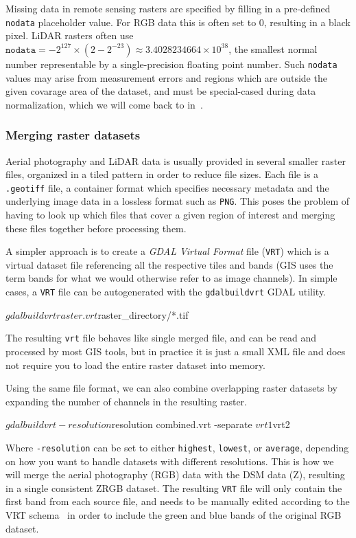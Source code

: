 Missing data in remote sensing rasters are specified by filling in a pre-defined \texttt{nodata} placeholder value.
For RGB data this is often set to $0$, resulting in a black pixel.
LiDAR rasters often use $\texttt{nodata} = -2^{127} \times (2 - 2^{-23}) \approx 3.4028234664 \times 10^{38}$, the smallest normal number representable by a single-precision floating point number.
Such \texttt{nodata} values may arise from measurement errors and regions which are outside the given covarage area of the dataset, and must be special-cased during data normalization, which we will come back to in~.

\subsubsection*{Merging raster datasets}

Aerial photography and LiDAR data is usually provided in several smaller raster files, organized in a tiled pattern in order to reduce file sizes.
Each file is a \texttt{.geotiff} file, a container format which specifies necessary metadata and the underlying image data in a lossless format such as \texttt{PNG}.
This poses the problem of having to look up which files that cover a given region of interest and merging these files together before processing them.

A simpler approach is to create a \textit{GDAL Virtual Format} file (\texttt{VRT}) which is a virtual dataset file referencing all the respective tiles and bands (GIS uses the term bands for what we would otherwise refer to as image channels).
In simple cases, a \texttt{VRT} file can be autogenerated with the \texttt{gdalbuildvrt} GDAL utility.

\begin{shellcode}
$ gdalbuildvrt raster.vrt ${raster_directory}/*.tif
\end{shellcode}
%
The resulting \texttt{vrt} file behaves like single merged file, and can be read and processed by most GIS tools, but in practice it is just a small XML file and does not require you to load the entire raster dataset into memory.

Using the same file format, we can also combine overlapping raster datasets by expanding the number of channels in the resulting raster.

\begin{shellcode}
$ gdalbuildvrt -resolution ${resolution} combined.vrt -separate ${vrt1} ${vrt2} 
\end{shellcode}
%
Where \texttt{-resolution} can be set to either \texttt{highest}, \texttt{lowest}, or \texttt{average}, depending on how you want to handle datasets with different resolutions.
This is how we will merge the aerial photography (RGB) data with the DSM data (Z), resulting in a single consistent ZRGB dataset.
The resulting \texttt{VRT} file will only contain the first band from each source file, and needs to be manually edited according to the VRT schema~\cite{vrt_schema_2015} in order to include the green and blue bands of the original RGB dataset.

